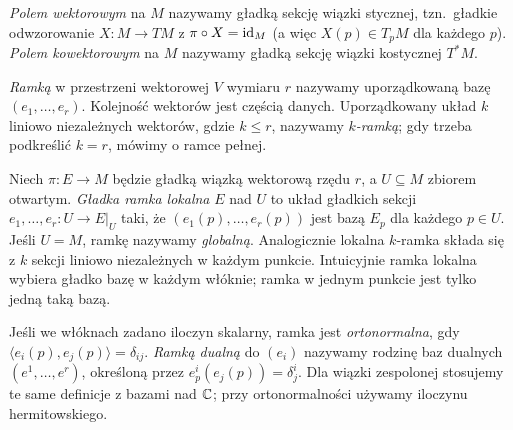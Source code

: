 \begin{definicja}
\emph{Polem wektorowym} na $M$ nazywamy gładką sekcję wiązki stycznej, tzn.\ gładkie
odwzorowanie $X\colon M\to TM$ z $\pi\circ X=\mathrm{id}_M$ (a więc $X(p)\in T_pM$ dla każdego
$p$). \emph{Polem kowektorowym} na $M$ nazywamy gładką sekcję wiązki kostycznej $T^*M$.
\end{definicja}

\begin{definicja}
\label{def:ramka-lokalna}
\emph{Ramką} w przestrzeni wektorowej $V$ wymiaru $r$
nazywamy uporządkowaną bazę $(e_1,\ldots,e_r)$.
Kolejność wektorów jest częścią danych.
Uporządkowany układ $k$ liniowo niezależnych wektorów,
gdzie $k\leq r$, nazywamy \emph{$k$-ramką};
gdy trzeba podkreślić $k=r$, mówimy o ramce pełnej.

Niech $\pi:E\to M$ będzie gładką wiązką wektorową rzędu $r$,
a $U\subseteq M$ zbiorem otwartym.
\emph{Gładka ramka lokalna} $E$ nad $U$ to układ
gładkich sekcji $e_1,\ldots,e_r:U\to E|_U$ taki, że
$(e_1(p),\ldots,e_r(p))$ jest bazą $E_p$ dla każdego $p\in U$.
Jeśli $U=M$, ramkę nazywamy \emph{globalną}.
Analogicznie lokalna $k$-ramka składa się z $k$ sekcji
liniowo niezależnych w każdym punkcie.
Intuicyjnie ramka lokalna wybiera gładko bazę w każdym włóknie;
ramka w jednym punkcie jest tylko jedną taką bazą.

Jeśli we włóknach zadano iloczyn skalarny, ramka jest
\emph{ortonormalna}, gdy
$\langle e_i(p),e_j(p)\rangle=\delta_{ij}$.
\emph{Ramką dualną} do $(e_i)$ nazywamy rodzinę baz dualnych
$(e^1,\ldots,e^r)$, określoną przez
$e^i_p(e_j(p))=\delta^i_j$.
Dla wiązki zespolonej stosujemy te same definicje z bazami
nad $\mathbb{C}$; przy ortonormalności używamy iloczynu hermitowskiego.
\end{definicja}

